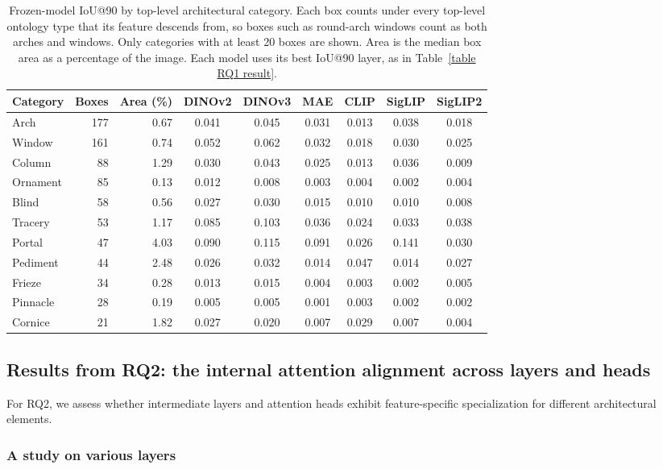 \documentclass[lineno,pdflatex,sn-mathphys-num]{sn-jnl}%
\theoremstyle{thmstyleone}%
\theoremstyle{thmstyletwo}%
\theoremstyle{thmstylethree}%
\begin{document}
\begin{table}[!h]
\centering
\caption{Frozen-model IoU@90 by top-level architectural category. Each box counts under every top-level ontology type that its feature descends from, so boxes such as round-arch windows count as both arches and windows. Only categories with at least 20 boxes are shown. Area is the median box area as a percentage of the image. Each model uses its best IoU@90 layer, as in Table~\ref{table RQ1 result}.\label{table RQ1 feature categories}}
\begin{tabular}{lrrcccccc}
\toprule
Category & Boxes & Area (\%) & DINOv2 & DINOv3 & MAE & CLIP & SigLIP & SigLIP2 \\ \midrule
Arch     & 177 & 0.67 & 0.041 & 0.045 & 0.031 & 0.013 & 0.038 & 0.018 \\
Window   & 161 & 0.74 & 0.052 & 0.062 & 0.032 & 0.018 & 0.030 & 0.025 \\
Column   &  88 & 1.29 & 0.030 & 0.043 & 0.025 & 0.013 & 0.036 & 0.009 \\
Ornament &  85 & 0.13 & 0.012 & 0.008 & 0.003 & 0.004 & 0.002 & 0.004 \\
Blind    &  58 & 0.56 & 0.027 & 0.030 & 0.015 & 0.010 & 0.010 & 0.008 \\
Tracery  &  53 & 1.17 & 0.085 & 0.103 & 0.036 & 0.024 & 0.033 & 0.038 \\
Portal   &  47 & 4.03 & 0.090 & 0.115 & 0.091 & 0.026 & 0.141 & 0.030 \\
Pediment &  44 & 2.48 & 0.026 & 0.032 & 0.014 & 0.047 & 0.014 & 0.027 \\
Frieze   &  34 & 0.28 & 0.013 & 0.015 & 0.004 & 0.003 & 0.002 & 0.005 \\
Pinnacle &  28 & 0.19 & 0.005 & 0.005 & 0.001 & 0.003 & 0.002 & 0.002 \\
Cornice  &  21 & 1.82 & 0.027 & 0.020 & 0.007 & 0.029 & 0.007 & 0.004 \\ \bottomrule
\end{tabular}
\end{table}


\subsection{Results from RQ2: the internal attention alignment across layers and heads}

For RQ2, we assess whether intermediate layers and attention heads exhibit feature-specific specialization for different architectural elements. 

\subsubsection{A study on various layers}
\end{document}
